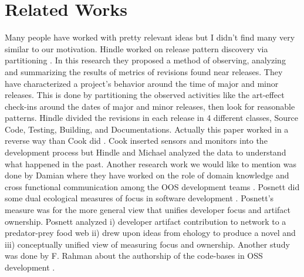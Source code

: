 \documentclass{acm_proc_article-sp}
\begin{document}
\section{Related Works}
Many people have worked with pretty relevant ideas but I didn't find many very similar to our motivation. Hindle worked on release pattern discovery via partitioning \cite{9_hindle}. In this research they proposed a method of observing, analyzing and summarizing the results of metrics of revisions found near releases. They have characterized a project's behavior around the time of major and minor releases. This is done by partitioning the observed activities like the art-effect check-ins around the dates of major and minor releases, then look for reasonable patterns. Hindle divided the revisions in each release in 4 different classes, Source Code, Testing, Building, and Documentations. Actually this paper worked in a reverse way than Cook did \cite{10_cook}. Cook inserted sensors and monitors into the development process but Hindle and Michael analyzed the data to understand what happened in the past.
Another research work we would like to mention was done by  Damian where they have worked on the role of domain knowledge and cross functional communication among the OOS development teams \cite{11_damian}. Posnett did some dual ecological measures of focus in software development \cite{12_posnett}. Posnett's measure was for the more general view that unifies developer focus and artifact ownership. Posnett analyzed i) developer artifact contribution to network to a predator-prey food web ii) drew upon ideas from ehology to produce a novel and iii) conceptually unified view of measuring focus and ownership. Another study was done by F. Rahman about the authorship of the code-bases in OSS development \cite{13_rahman}.
\end{document}

